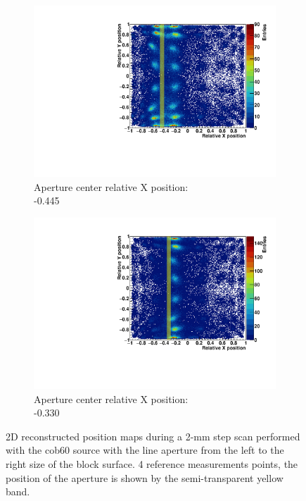 \begin{figure}
\begin{subfigure}[t]{0.5\textwidth}
\centering
\includegraphics[width=\textwidth]{03_GraphicFiles/chapter3_CLaRySproto/Absorber/images_scan/line_2mm/run10_floodMap.pdf}
\caption{Aperture center relative X position: \\ -0.445}
\label{chap3::fig::scan_map3}
\end{subfigure}
\begin{subfigure}[t]{0.5\textwidth}
\centering
\includegraphics[width=\textwidth]{03_GraphicFiles/chapter3_CLaRySproto/Absorber/images_scan/line_2mm/run11_floodMap.pdf}
\caption{Aperture center relative X position: \\ -0.330}
\label{chap3::fig::scan_map4}
\end{subfigure}
\caption{2D reconstructed position maps during a 2-mm step scan performed with the \gls{cob60} source with the line aperture from the left to the right size of the block surface. 4 reference measurements points, the position of the aperture is shown by the semi-transparent yellow band.}
\label{chap3::fig::ScanFloodMap}
\end{figure}

